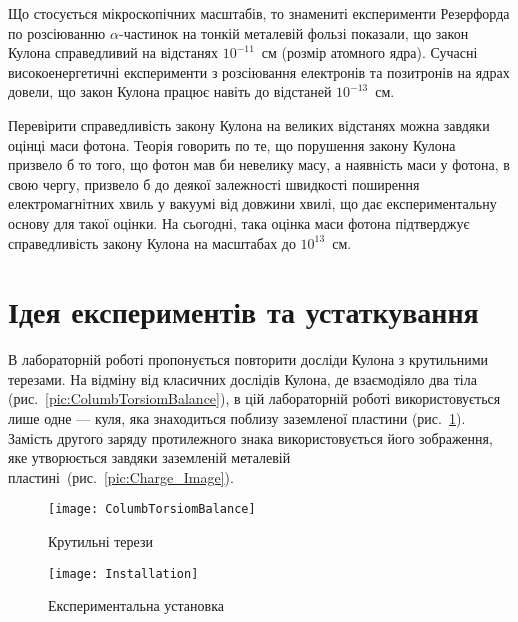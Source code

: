 Що стосується мікроскопічних масштабів, то знамениті експерименти Резерфорда по розсіюванню $\alpha$-частинок на тонкій металевій фользі показали, що закон Кулона справедливий на відстанях $10^{-11}$~см (розмір атомного ядра). Сучасні високоенергетичні експерименти з розсіювання електронів та позитронів на ядрах довели, що закон Кулона працює навіть до відстаней $10^{-13}$~см.

Перевірити справедливість закону Кулона на великих відстанях можна завдяки оцінці маси фотона. Теорія говорить по те, що порушення закону Кулона призвело б то того, що  фотон мав би невелику масу, а наявність маси у фотона, в свою чергу, призвело б до деякої залежності швидкості поширення електромагнітних хвиль у вакуумі від довжини хвилі, що дає експериментальну основу для такої оцінки.  На сьогодні, така оцінка маси фотона підтверджує справедливість закону Кулона на масштабах до $ 10^{13} $~см. 


\section{Ідея експериментів та устаткування}



В лабораторній роботі пропонується повторити досліди Кулона  з крутильними терезами. На відміну від класичних дослідів Кулона, де взаємодіяло два тіла (рис.~\ref{pic:ColumbTorsiomBalance}), в цій лабораторній роботі використовується лише одне --- куля, яка знаходиться поблизу заземленої пластини (рис.~\ref{pic:Installation}). Замість другого заряду протилежного знака використовується його зображення, яке утворюється завдяки заземленій металевій пластині~(рис.~\ref{pic:Charge_Image}).

\begin{figure}[ht!]\centering
	\begin{minipage}[t]{0.45\linewidth}\centering
			\texttt{[image: ColumbTorsiomBalance]}
			\caption{Крутильні терези}
			\label{pic:ColumbTorsiomBalance}
	\end{minipage}
	\quad%
	\begin{minipage}[t]{0.45\linewidth}\centering
			\texttt{[image: Installation]}
			\caption{Експериментальна установка}
			\label{pic:Installation}
	\end{minipage}
\end{figure}

